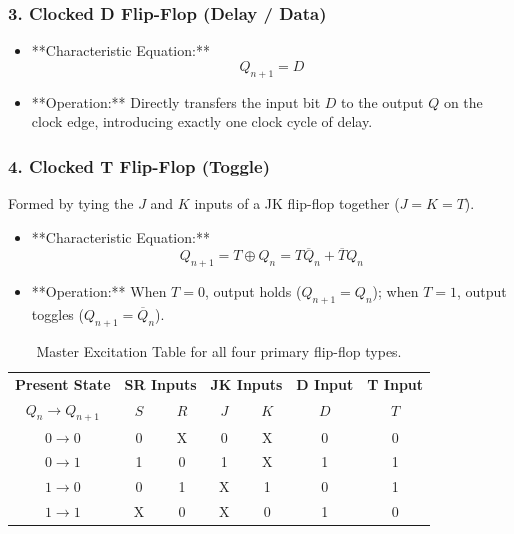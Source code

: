 \subsubsection{3. Clocked D Flip-Flop (Delay / Data)}
\begin{itemize}
    \item **Characteristic Equation:**
    \begin{equation}
        Q_{n+1} = D
    \end{equation}
    \item **Operation:** Directly transfers the input bit $D$ to the output $Q$ on the clock edge, introducing exactly one clock cycle of delay.
\end{itemize}

\subsubsection{4. Clocked T Flip-Flop (Toggle)}
Formed by tying the $J$ and $K$ inputs of a JK flip-flop together ($J = K = T$).
\begin{itemize}
    \item **Characteristic Equation:**
    \begin{equation}
        Q_{n+1} = T \oplus Q_n = T\overline{Q}_n + \overline{T}Q_n
    \end{equation}
    \item **Operation:** When $T = 0$, output holds ($Q_{n+1} = Q_n$); when $T = 1$, output toggles ($Q_{n+1} = \overline{Q}_n$).
\end{itemize}

\begin{table}[htbp]
\centering
\small
\begin{tabularx}{\textwidth}{c|cc|cc|c|c}
\toprule
\textbf{Present State} & \multicolumn{2}{c|}{\textbf{SR Inputs}} & \multicolumn{2}{c|}{\textbf{JK Inputs}} & \textbf{D Input} & \textbf{T Input} \\
$Q_n \rightarrow Q_{n+1}$ & $S$ & $R$ & $J$ & $K$ & $D$ & $T$ \\
\midrule
$0 \longrightarrow 0$ & 0 & X & 0 & X & 0 & 0 \\
$0 \longrightarrow 1$ & 1 & 0 & 1 & X & 1 & 1 \\
$1 \longrightarrow 0$ & 0 & 1 & X & 1 & 0 & 1 \\
$1 \longrightarrow 1$ & X & 0 & X & 0 & 1 & 0 \\
\bottomrule
\end{tabularx}
\caption{Master Excitation Table for all four primary flip-flop types.}
\label{tab:master-excitation}
\end{table}

